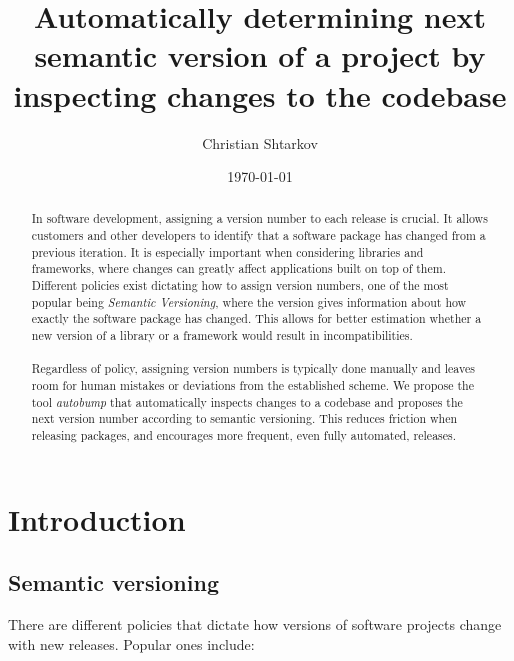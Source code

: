 \documentclass{l4proj}
\begin{document}
\title{Automatically determining next semantic version of a project by \\
  inspecting changes to the codebase}
\author{Christian Shtarkov}
\date{\today}
\maketitle

\begin{abstract}
In software development, assigning a version number
to each release is crucial. It allows customers and other developers
to identify that a software package has changed from a previous
iteration. It is especially important when considering libraries and
frameworks, where changes can greatly affect applications built on top
of them. \\ Different policies exist dictating how to assign version
numbers, one of the most popular being \textit{Semantic
Versioning}\cite{SemanticVersioning}, where the version gives
information about how exactly the software package has changed. This
allows for better estimation whether a new version of a library or a
framework would result in incompatibilities.
\\\\
Regardless of
policy, assigning version numbers is typically done manually and
leaves room for human mistakes or deviations from the established
scheme. We propose the tool \textit{autobump} that automatically
inspects changes to a codebase and proposes the next version number
according to semantic versioning. This reduces friction when releasing
packages, and encourages more frequent, even fully automated,
releases.
\end{abstract}

\educationalconsent

\tableofcontents

\chapter{Introduction}

\section{Semantic versioning}

There are different policies that dictate how versions of software
projects change with new releases. Popular ones include:
\end{document}
